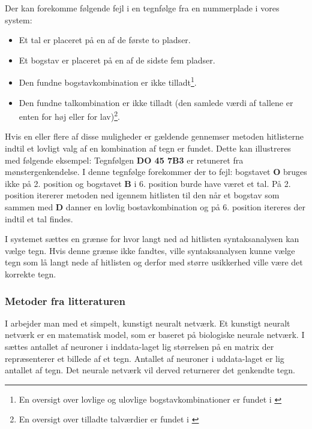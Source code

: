 Der kan forekomme følgende fejl i en tegnfølge fra en nummerplade i vores system:

\begin{itemize}
\item Et tal er placeret på en af de første to pladser.
\item Et bogstav er placeret på en af de sidste fem pladser.
\item Den fundne bogstavkombination er ikke tilladt\footnote{En oversigt over lovlige og ulovlige bogstavkombinationer er fundet i \cite{bogstav_komb}}.
\item Den fundne talkombination er ikke tilladt (den samlede værdi af tallene er enten for høj eller for lav)\footnote{En oversigt over tilladte talværdier er fundet i \cite{nrpl}}.
\end{itemize}

Hvis en eller flere af disse muligheder er gældende gennemser metoden hitlisterne indtil et lovligt valg af en kombination af tegn er fundet. Dette kan illustreres med følgende eksempel: Tegnfølgen \textbf{DO 45 7B3} er retuneret fra mønstergenkendelse. I denne tegnfølge forekommer der to fejl: bogstavet \textbf{O} bruges ikke på 2. position og bogstavet \textbf{B} i 6. position burde have været et tal. På 2. position itererer metoden ned igennem hitlisten til den når et bogstav som sammen med \textbf{D} danner en lovlig bostavkombination og på 6. position itereres der indtil et tal findes.

I systemet sættes en grænse for hvor langt ned ad hitlisten syntaksanalysen kan vælge tegn. Hvis denne grænse ikke fandtes, ville syntaksanalysen kunne vælge tegn som lå langt nede af hitlisten og derfor med større usikkerhed ville være det korrekte tegn.


\subsubsection*{Metoder fra litteraturen}

I \cite{kwas} arbejder man med et simpelt, kunstigt neuralt netværk. Et kunstigt neuralt netværk er en matematisk model, som er baseret på biologiske neurale netværk\cite{wiki_nn}. I \cite{kwas} sættes antallet af neuroner i inddata-laget lig størrelsen på en matrix der repræsenterer et billede af et tegn. Antallet af neuroner i uddata-laget er lig antallet af tegn. Det neurale netværk vil derved returnerer det genkendte tegn.